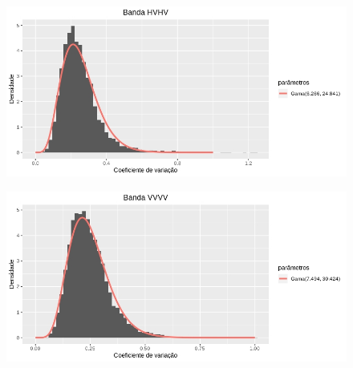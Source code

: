 \documentclass[12pt]{article}
\begin{document}
\begin{figure}[!ht]
    \centering
    \includegraphics[scale = 0.75]{../../Images/Report_18_09_17/density_hvhv.jpeg}
\end{figure}

\begin{figure}[!ht]
    \centering
    \includegraphics[scale = 0.75]{../../Images/Report_18_09_17/density_vvvv.jpeg}
\end{figure}
\end{document}
